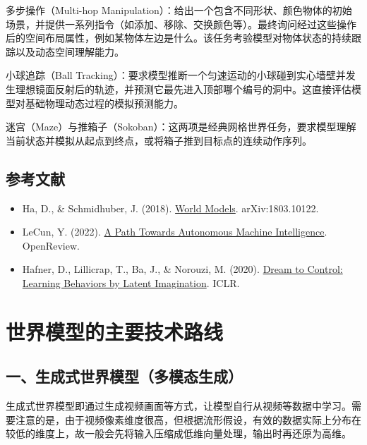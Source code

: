 多步操作（Multi-hop Manipulation）：给出一个包含不同形状、颜色物体的初始场景，并提供一系列指令（如添加、移除、交换颜色等）。最终询问经过这些操作后的空间布局属性，例如某物体左边是什么。该任务考验模型对物体状态的持续跟踪以及动态空间理解能力。

小球追踪（Ball Tracking）：要求模型推断一个匀速运动的小球碰到实心墙壁并发生理想镜面反射后的轨迹，并预测它最先进入顶部哪个编号的洞中。这直接评估模型对基础物理动态过程的模拟预测能力。

迷宫（Maze）与推箱子（Sokoban）：这两项是经典网格世界任务，要求模型理解当前状态并模拟从起点到终点，或将箱子推到目标点的连续动作序列。

\hypertarget{ux53c2ux8003ux6587ux732e-168}{%
\subsection{参考文献}\label{ux53c2ux8003ux6587ux732e-168}}

\begin{itemize}
\tightlist
\item
  Ha, D., \& Schmidhuber, J. (2018). \href{https://arxiv.org/abs/1803.10122}{World Models}. arXiv:1803.10122.
\item
  LeCun, Y. (2022). \href{https://openreview.net/forum?id=BZ5a1r-kVsf}{A Path Towards Autonomous Machine Intelligence}. OpenReview.
\item
  Hafner, D., Lillicrap, T., Ba, J., \& Norouzi, M. (2020). \href{https://arxiv.org/abs/1912.01603}{Dream to Control: Learning Behaviors by Latent Imagination}. ICLR.
\end{itemize}

\clearpage

\hypertarget{ux4e16ux754cux6a21ux578bux7684ux4e3bux8981ux6280ux672fux8defux7ebf}{%
\section{世界模型的主要技术路线}\label{ux4e16ux754cux6a21ux578bux7684ux4e3bux8981ux6280ux672fux8defux7ebf}}

\hypertarget{ux4e00ux751fux6210ux5f0fux4e16ux754cux6a21ux578bux591aux6a21ux6001ux751fux6210}{%
\subsection{一、生成式世界模型（多模态生成）}\label{ux4e00ux751fux6210ux5f0fux4e16ux754cux6a21ux578bux591aux6a21ux6001ux751fux6210}}

生成式世界模型即通过生成视频画面等方式，让模型自行从视频等数据中学习。需要注意的是，由于视频像素维度很高，但根据流形假设，有效的数据实际上分布在较低的维度上，故一般会先将输入压缩成低维向量处理，输出时再还原为高维。

